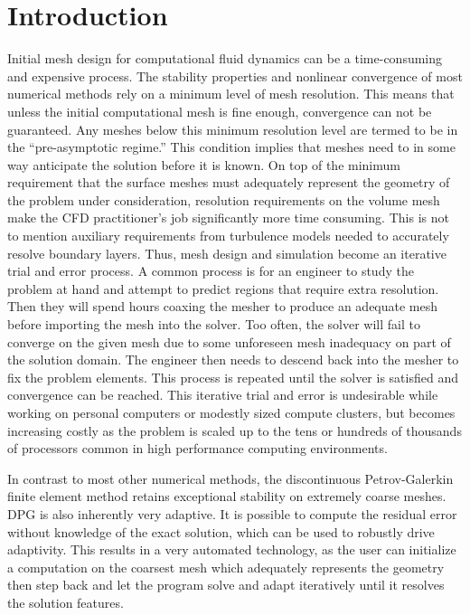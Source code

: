 \documentclass[preprint,12pt]{elsarticle}
\begin{document}
\section{Introduction}
Initial mesh design for computational fluid dynamics can be a time-consuming and expensive process. 
The stability properties and nonlinear convergence of most numerical methods rely on a minimum level of mesh resolution. 
This means that unless the initial computational mesh is fine enough, convergence can not be guaranteed. 
Any meshes below this minimum resolution level are termed to be in the ``pre-asymptotic regime.'' 
This condition implies that meshes need to in some way anticipate the solution before it is known. 
On top of the minimum requirement that the surface meshes must adequately represent the geometry of the problem under consideration, 
resolution requirements on the volume mesh make the CFD practitioner's job significantly more time consuming. 
This is not to mention auxiliary requirements from turbulence models needed to accurately resolve boundary layers. 
Thus, mesh design and simulation become an iterative trial and error process.
A common process is for an engineer to study the problem at hand and attempt to predict regions that require extra resolution. 
Then they will spend hours coaxing the mesher to produce an adequate mesh before importing the mesh into the solver.
Too often, the solver will fail to converge on the given mesh due to some unforeseen mesh inadequacy on part of the solution domain.
The engineer then needs to descend back into the mesher to fix the problem elements.
This process is repeated until the solver is satisfied and convergence can be reached.
This iterative trial and error is undesirable while working on personal computers or modestly sized compute clusters, 
but becomes increasing costly as the problem is scaled up to the tens or hundreds of thousands of processors common in high performance computing environments.

In contrast to most other numerical methods, the discontinuous Petrov-Galerkin finite element method retains exceptional stability on extremely coarse meshes.
DPG is also inherently very adaptive.
It is possible to compute the residual error without knowledge of the exact solution, which can be used to robustly drive adaptivity.
This results in a very automated technology, as the user can initialize a computation on the coarsest mesh which adequately represents the geometry 
then step back and let the program solve and adapt iteratively until it resolves the solution features.
\end{document}
